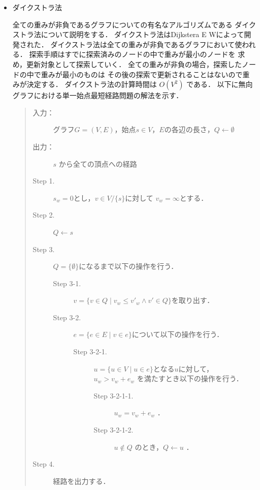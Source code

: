 \documentclass[12pt]{optlab-bachelor}
\begin{document}
\begin{itemize}
  \item ダイクストラ法

  全ての重みが非負であるグラフについての有名なアルゴリズムである
  ダイクストラ法について説明をする．
  ダイクストラ法はDijkstera E W\cite{Dijkstera}によって開発された．
  ダイクストラ法は全ての重みが非負であるグラフにおいて使われる．
  探索手順はすでに探索済みのノードの中で重みが最小のノードを
  求め，更新対象として探索していく．
  全ての重みが非負の場合，探索したノードの中で重みが最小のものは
  その後の探索で更新されることはないので重みが決定する．
  ダイクストラ法の計算時間は $O(V^2)$ である．
  以下に無向グラフにおける単一始点最短経路問題の解法を示す．

  \begin{quote}
    \begin{description}
      \item[入力：] グラフ$G=(V,E)$，始点$s \in V$，$E$の各辺の長さ，$Q \leftarrow \emptyset$
      \item[出力：] $s$ から全ての頂点への経路
      \item[Step 1.] $s_w = 0$とし，$v \in V/ \{ s\}$に対して $v_w = \infty$とする．
      \item[Step 2.] $Q \leftarrow s$
      \item[Step 3.] $Q = \{\emptyset\}$になるまで以下の操作を行う．
      \begin{description}
        \item[Step 3-1.] $v = \{ v \in Q \mid v_w \leq v'_w \land v' \in Q \}$を取り出す．
        \item[Step 3-2.] $e = \{ e \in E \mid v \in e \}$について以下の操作を行う．
        \begin{description}
          \item[Step 3-2-1.] $u = \{ u \in V \mid u \in e\}$となる$u$に対して，
          $u_w > v_w + e_w$ を満たすとき以下の操作を行う．

          \begin{description}
            \item[Step 3-2-1-1.] $u_w = v_w + e_w$ ．
            \item[Step 3-2-1-2.] $u \notin Q$ のとき，$Q \leftarrow u$ ．
          \end{description}
        \end{description}
      \end{description}

      \item[Step 4.] 経路を出力する．
    \end{description}
  \end{quote}
\end{itemize}
\end{document}
